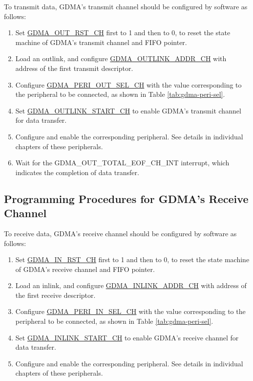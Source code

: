 \documentclass[main\_\_EN.tex]{subfiles}
\begin{document}
To transmit data, GDMA's transmit channel should be configured by software as follows:
\begin{enumerate}
    \item Set \hyperref[fielddesc:GDMAOUTRSTCHN]{GDMA\_OUT\_RST\_CH} first to 1 and then to 0, to reset the state machine of GDMA's transmit channel and FIFO pointer.
    \item Load an outlink, and configure \hyperref[fielddesc:GDMAOUTLINKADDRCHN]{GDMA\_OUTLINK\_ADDR\_CH}  with address of the first transmit descriptor.
    \item Configure \hyperref[fielddesc:GDMAPERIOUTSELCHN]{GDMA\_PERI\_OUT\_SEL\_CH} with the value corresponding to the peripheral to be connected, as shown in Table \ref{tab:gdma-peri-sel}.
    \item Set \hyperref[fielddesc:GDMAOUTLINKSTARTCHN]{GDMA\_OUTLINK\_START\_CH} to enable GDMA's transmit channel for data transfer.
    \item Configure and enable the corresponding peripheral. See details in individual chapters of these peripherals.
    \item Wait for the GDMA\_OUT\_TOTAL\_EOF\_CH\_INT interrupt, which indicates the completion of data transfer.
\end{enumerate}

\subsection{Programming Procedures for GDMA's Receive Channel}
To receive data, GDMA's receive channel should be configured by software as follows:
\begin{enumerate}
    \item Set \hyperref[fielddesc:GDMAINRSTCHN]{GDMA\_IN\_RST\_CH} first to 1 and then to 0, to reset the state machine of GDMA's receive channel and FIFO pointer.
    \item Load an inlink, and configure \hyperref[fielddesc:GDMAINLINKADDRCHN]{GDMA\_INLINK\_ADDR\_CH} with address of the first receive descriptor.
    \item Configure \hyperref[fielddesc:GDMAPERIINSELCHN]{GDMA\_PERI\_IN\_SEL\_CH} with the value corresponding to the peripheral to be connected, as shown in Table \ref{tab:gdma-peri-sel}.
    \item Set \hyperref[fielddesc:GDMAINLINKSTARTCHN]{GDMA\_INLINK\_START\_CH} to enable GDMA's receive channel for data transfer.
    \item Configure and enable the corresponding peripheral. See details in individual chapters of these peripherals.
\end{enumerate}
\end{document}
